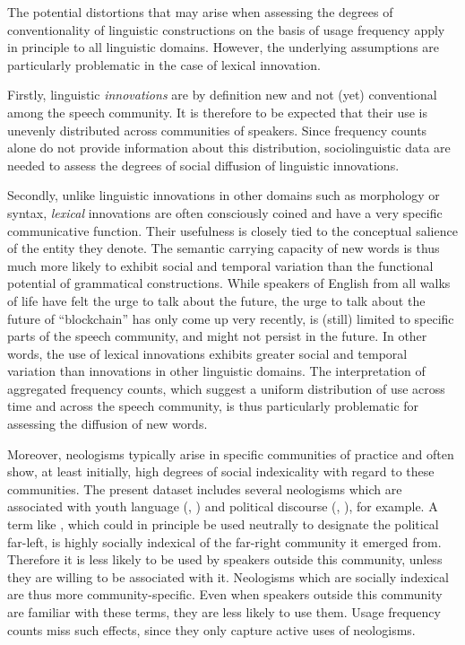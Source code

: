 \documentclass[
  a4paper,
  abstract=on,
  captions=tableabove
  ]{scrartcl}
\begin{document}
    The potential distortions that may arise when assessing the degrees of conventionality of linguistic constructions on the basis of usage frequency apply in principle to all linguistic domains. However, the underlying assumptions are particularly problematic in the case of lexical innovation.

    Firstly, linguistic \emph{innovations} are by definition new and not (yet) conventional among the speech community. It is therefore to be expected that their use is unevenly distributed across communities of speakers. Since frequency counts alone do not provide information about this distribution, sociolinguistic data are needed to assess the degrees of social diffusion of linguistic innovations.  

    Secondly, unlike linguistic innovations in other domains such as morphology or syntax, \emph{lexical} innovations are often consciously coined and have a very specific communicative function. Their usefulness is closely tied to the conceptual salience of the entity they denote. The semantic carrying capacity of new words is thus much more likely to exhibit social and temporal variation than the functional potential of grammatical constructions. While speakers of English from all walks of life have felt the urge to talk about the future, the urge to talk about the future of \enquote{blockchain} has only come up very recently, is (still) limited to specific parts of the speech community, and might not persist in the future. In other words, the use of lexical innovations exhibits greater social and temporal variation than innovations in other linguistic domains. The interpretation of aggregated frequency counts, which suggest a uniform distribution of use across time and across the speech community, is thus particularly problematic for assessing the diffusion of new words.

    Moreover, neologisms typically arise in specific communities of practice and often show, at least initially, high degrees of social indexicality with regard to these communities. The present dataset includes several neologisms which are associated with youth language (, ) and political discourse (, ), for example. A term like , which could in principle be used neutrally to designate the political far-left, is highly socially indexical of the far-right community it emerged from. Therefore it is less likely to be used by speakers outside this community, unless they are willing to be associated with it. Neologisms which are socially indexical are thus more community-specific. Even when speakers outside this community are familiar with these terms, they are less likely to use them. Usage frequency counts miss such effects, since they only capture active uses of neologisms.
\end{document}
